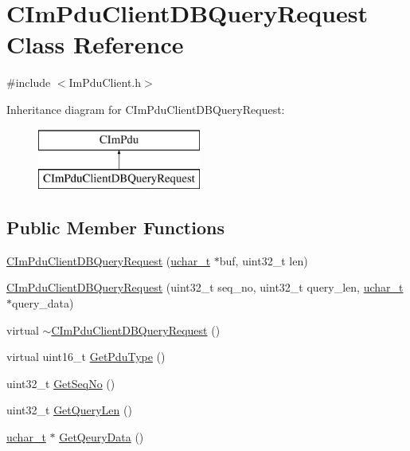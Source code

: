 \hypertarget{class_c_im_pdu_client_d_b_query_request}{}\section{C\+Im\+Pdu\+Client\+D\+B\+Query\+Request Class Reference}
\label{class_c_im_pdu_client_d_b_query_request}


{\ttfamily \#include $<$Im\+Pdu\+Client.\+h$>$}

Inheritance diagram for C\+Im\+Pdu\+Client\+D\+B\+Query\+Request\+:\begin{figure}[H]
\begin{center}
\leavevmode
\includegraphics[height=2.000000cm]{class_c_im_pdu_client_d_b_query_request}
\end{center}
\end{figure}
\subsection*{Public Member Functions}
\begin{DoxyCompactItemize}
\item 
\hyperlink{class_c_im_pdu_client_d_b_query_request_af63af960483a37d5a5455dc1de844779}{C\+Im\+Pdu\+Client\+D\+B\+Query\+Request} (\hyperlink{base_2ostype_8h_a124ea0f8f4a23a0a286b5582137f0b8d}{uchar\+\_\+t} $\ast$buf, uint32\+\_\+t len)
\item 
\hyperlink{class_c_im_pdu_client_d_b_query_request_af580e996812888e802ea554b576d3145}{C\+Im\+Pdu\+Client\+D\+B\+Query\+Request} (uint32\+\_\+t seq\+\_\+no, uint32\+\_\+t query\+\_\+len, \hyperlink{base_2ostype_8h_a124ea0f8f4a23a0a286b5582137f0b8d}{uchar\+\_\+t} $\ast$query\+\_\+data)
\item 
virtual \hyperlink{class_c_im_pdu_client_d_b_query_request_a5e268a909a0ab5212ec77f487c81c0d4}{$\sim$\+C\+Im\+Pdu\+Client\+D\+B\+Query\+Request} ()
\item 
virtual uint16\+\_\+t \hyperlink{class_c_im_pdu_client_d_b_query_request_ab50e2dd7bad4e5cd21ede34d521d1cca}{Get\+Pdu\+Type} ()
\item 
uint32\+\_\+t \hyperlink{class_c_im_pdu_client_d_b_query_request_a2a3ab0b1523972e3deb81ecbbbf5cca4}{Get\+Seq\+No} ()
\item 
uint32\+\_\+t \hyperlink{class_c_im_pdu_client_d_b_query_request_a227773783611a7687db68235f70af039}{Get\+Query\+Len} ()
\item 
\hyperlink{base_2ostype_8h_a124ea0f8f4a23a0a286b5582137f0b8d}{uchar\+\_\+t} $\ast$ \hyperlink{class_c_im_pdu_client_d_b_query_request_a61f347c4075f3aaefe4d3bdc99b440d5}{Get\+Qeury\+Data} ()
\end{DoxyCompactItemize}
